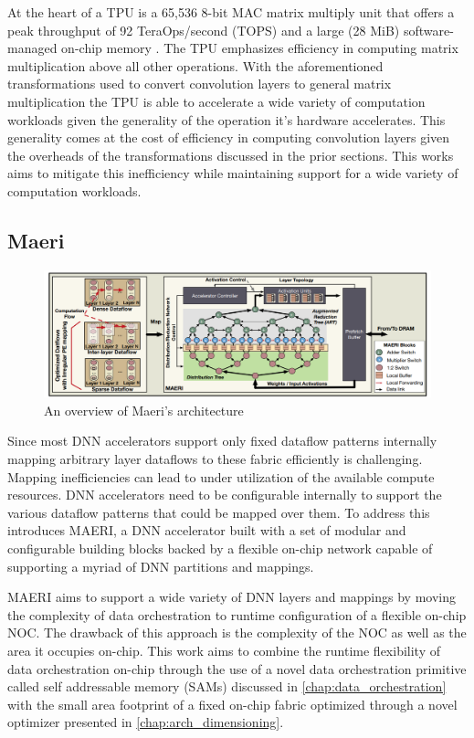 At the heart of a TPU is a 65,536 8-bit MAC matrix multiply unit that offers a
peak throughput of 92 TeraOps/second (TOPS) and a large (28 MiB)
software-managed on-chip memory \cite{tpu}. The TPU emphasizes efficiency in
computing matrix multiplication above all other operations. With the
aforementioned transformations used to convert convolution layers to general
matrix multiplication the TPU is able to accelerate a wide variety of
computation workloads given the generality of the operation it's hardware
accelerates. This generality comes at the cost of efficiency in computing
convolution layers given the overheads of the transformations discussed in the
prior sections. This works aims to mitigate this inefficiency while maintaining
support for a wide variety of computation workloads. 


\subsection{Maeri}
\label{chap:related_work:maeri}

\begin{figure}[!ht]
    \centering
    \includegraphics[scale=0.3]{fig/maeri.png}
    \caption{An overview of Maeri's architecture \cite{maeri}}
    \label{fig:maeri_arch}
\end{figure}

Since most DNN accelerators support only fixed dataflow patterns internally
mapping arbitrary layer dataflows to these fabric efficiently is challenging.
Mapping inefficiencies can lead to under utilization of the available compute
resources. DNN accelerators need to be configurable internally to support the
various dataflow patterns that could be mapped over them. To address this
\cite{maeri} introduces MAERI, a DNN accelerator built with a set of modular and
configurable building blocks backed by a flexible on-chip network capable of
supporting a myriad of DNN partitions and mappings. 

MAERI aims to support a wide variety of DNN layers and mappings by moving the
complexity of data orchestration to runtime configuration of a flexible on-chip
NOC. The drawback of this approach is the complexity of the NOC as well as the
area it occupies on-chip. This work aims to combine the runtime flexibility of
data orchestration on-chip through the use of a novel data orchestration
primitive called self addressable memory (SAMs) discussed in
\autoref{chap:data_orchestration} with the small area footprint of a fixed
on-chip fabric optimized through a novel optimizer presented in
\autoref{chap:arch_dimensioning}. 